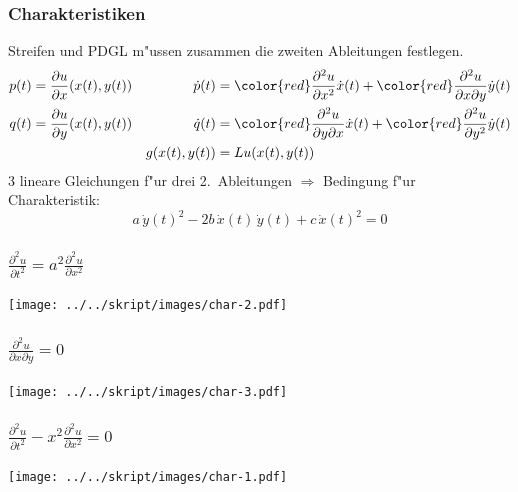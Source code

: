 \documentclass{beamer}
\begin{document}
\begin{frame}
\frametitle{Charakteristiken}

Streifen und PDGL m"ussen zusammen die zweiten Ableitungen festlegen.
\begin{align*}
p(t)&=\frac{\partial u}{\partial x}(x(t), y(t))
&
\dot p(t)
&={\color{red} \frac{\partial^2 u}{\partial x^2}}\dot x(t)
+
{\color{red}\frac{\partial^2u}{\partial x\partial y}}\dot y(t)
\\
q(t)&=\frac{\partial u}{\partial y}(x(t), y(t))
&
\dot q(t)
&=
{\color{red}\frac{\partial^2 u}{\partial y\partial x}}\dot x(t)
+
{\color{red}\frac{\partial^2u}{\partial y^2}}\dot y(t)
\\
&&g(x(t),y(t))&=Lu (x(t),y(t))
\end{align*}
3 lineare Gleichungen f"ur drei 2.~Ableitungen
$\Rightarrow$
Bedingung f"ur Charakteristik:
\[
a\,\dot y(t)^2-2b\,\dot x(t)\,\dot y(t)+c\,\dot x(t)^2=0
\]
\end{frame}

\begin{frame}
\frametitle{$\displaystyle \frac{\partial^2u}{\partial t^2}=a^2\frac{\partial^2u}{\partial x^2}$}
\pause
\begin{center}
\texttt{[image: ../../skript/images/char-2.pdf]}
\end{center}
\end{frame}

\begin{frame}
\frametitle{$\displaystyle \frac{\partial^2 u}{\partial x\partial y}=0$}
\pause
\begin{center}
\texttt{[image: ../../skript/images/char-3.pdf]}
\end{center}
\end{frame}

\begin{frame}
\frametitle{$\displaystyle \frac{\partial^2u}{\partial t^2}-x^2\frac{\partial^2 u}{\partial x^2}=0$}
\pause
\begin{center}
\texttt{[image: ../../skript/images/char-1.pdf]}
\end{center}
\end{frame}
\end{document}
